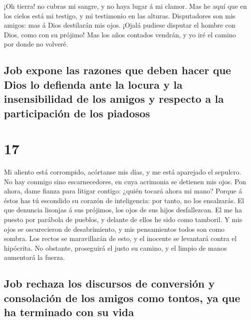  ¡Oh tierra! no cubras mi sangre, y no haya lugar á mi
clamor.  Mas he aquí que en los cielos está mi testigo, y
mi testimonio en las alturas.  Disputadores son mis amigos:
mas á Dios destilarán mis ojos.  ¡Ojalá pudiese disputar el
hombre con Dios, como con su prójimo!  Mas los años
contados vendrán, y yo iré el camino por donde no volveré.

\hypertarget{job-expone-las-razones-que-deben-hacer-que-dios-lo-defienda-ante-la-locura-y-la-insensibilidad-de-los-amigos-y-respecto-a-la-participaciuxf3n-de-los-piadosos}{%
\subsection{Job expone las razones que deben hacer que Dios lo defienda
ante la locura y la insensibilidad de los amigos y respecto a la
participación de los
piadosos}\label{job-expone-las-razones-que-deben-hacer-que-dios-lo-defienda-ante-la-locura-y-la-insensibilidad-de-los-amigos-y-respecto-a-la-participaciuxf3n-de-los-piadosos}}

\hypertarget{section-16}{%
\section{17}\label{section-16}}

 Mi aliento está corrompido, acórtanse mis días, y me está
aparejado el sepulcro.  No hay conmigo sino escarnecedores,
en cuya acrimonia se detienen mis ojos.  Pon ahora, dame
fianza para litigar contigo: ¿quién tocará ahora mi mano? 
Porque á éstos has tú escondido su corazón de inteligencia: por tanto,
no los ensalzarás.  El que denuncia lisonjas á sus prójimos,
los ojos de sus hijos desfallezcan.  El me ha puesto por
parábola de pueblos, y delante de ellos he sido como tamboril.
 Y mis ojos se oscurecieron de desabrimiento, y mis
pensamientos todos son como sombra.  Los rectos se
maravillarán de esto, y el inocente se levantará contra el hipócrita.
 No obstante, proseguirá el justo su camino, y el limpio de
manos aumentará la fuerza.

\hypertarget{job-rechaza-los-discursos-de-conversiuxf3n-y-consolaciuxf3n-de-los-amigos-como-tontos-ya-que-ha-terminado-con-su-vida}{%
\subsection{Job rechaza los discursos de conversión y consolación de los
amigos como tontos, ya que ha terminado con su
vida}\label{job-rechaza-los-discursos-de-conversiuxf3n-y-consolaciuxf3n-de-los-amigos-como-tontos-ya-que-ha-terminado-con-su-vida}}

